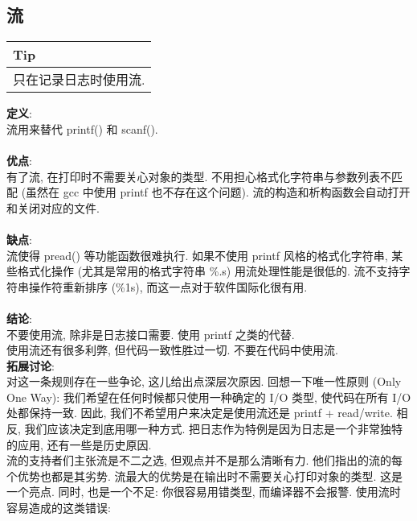 \documentclass[a4paper,11pt,CJK]{article}
\begin{document}
\begin{CJK}{UTF8}{gbsn}
\subsection{流}
\begin{table}[htbp]
\flushleft
\begin{tabular}{p{400pt}}
\toprule
\rowcolor[gray]{.8} Tip \\
\midrule
只在记录日志时使用流.\\
\bottomrule
\end{tabular}
\end{table}
\noindent
\textbf{定义}:\\
\indent 流用来替代 printf() 和 scanf().\\
\\
\textbf{优点}:\\
\indent 有了流, 在打印时不需要关心对象的类型. 不用担心格式化字符串与参数列表不匹配 (虽然在 gcc 中使用 printf 也不存在这个问题). 流的构造和析构函数会自动打开和关闭对应的文件.\\
\\
\textbf{缺点}:\\
\indent 流使得 pread() 等功能函数很难执行. 如果不使用 printf 风格的格式化字符串, 某些格式化操作 (尤其是常用的格式字符串 \%.\raisebox{-3pt}{*}s) 用流处理性能是很低的. 流不支持字符串操作符重新排序 (\%1s), 而这一点对于软件国际化很有用.\\
\\
\textbf{结论}:\\
\indent 不要使用流, 除非是日志接口需要. 使用 printf 之类的代替.\\
\indent 使用流还有很多利弊, 但代码一致性胜过一切. 不要在代码中使用流.
\\
\textbf{拓展讨论}:\\
\indent 对这一条规则存在一些争论, 这儿给出点深层次原因. 回想一下唯一性原则 (Only One Way): 我们希望在任何时候都只使用一种确定的 I/O 类型, 使代码在所有 I/O 处都保持一致. 因此, 我们不希望用户来决定是使用流还是 printf + read/write. 相反, 我们应该决定到底用哪一种方式. 把日志作为特例是因为日志是一个非常独特的应用, 还有一些是历史原因.\\
\indent 流的支持者们主张流是不二之选, 但观点并不是那么清晰有力. 他们指出的流的每个优势也都是其劣势. 流最大的优势是在输出时不需要关心打印对象的类型. 这是一个亮点. 同时, 也是一个不足: 你很容易用错类型, 而编译器不会报警. 使用流时容易造成的这类错误:
\\
\\
\end{CJK}
\end{document}
